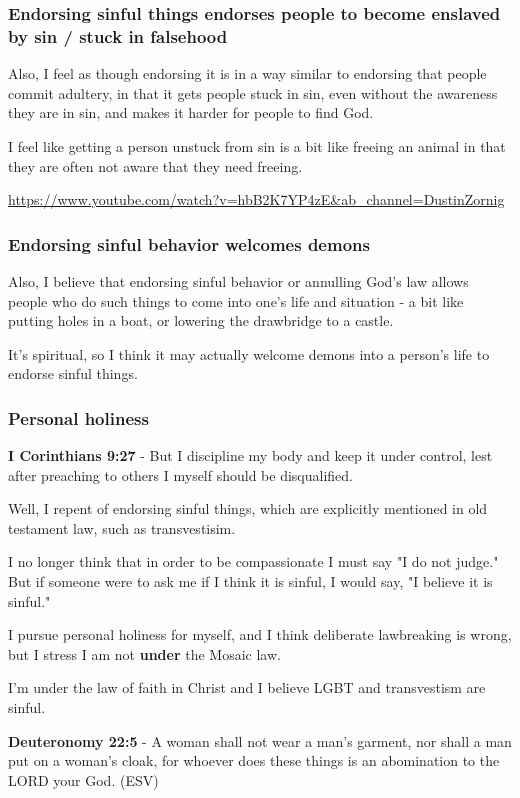 \documentclass[11pt]{article}
\begin{document}
\subsubsection{Endorsing sinful things endorses people to become enslaved by sin / stuck in falsehood}
\label{sec:org3cfaa02}
Also, I feel as though endorsing it is in a
way similar to endorsing that people commit
adultery, in that it gets people stuck in sin,
even without the awareness they are in sin,
and makes it harder for people to find God.

I feel like getting a person unstuck from sin
is a bit like freeing an animal in that they
are often not aware that they need freeing.

\url{https://www.youtube.com/watch?v=hbB2K7YP4zE\&ab\_channel=DustinZornig}

\subsubsection{Endorsing sinful behavior welcomes demons}
\label{sec:org3af550f}
Also, I believe that endorsing sinful behavior
or annulling God's law allows people who do
such things to come into one's life and
situation - a bit like putting holes in a
boat, or lowering the drawbridge to a castle.

It's spiritual, so I think it may actually
welcome demons into a person's life to endorse
sinful things.

\subsubsection{Personal holiness}
\label{sec:org0f1dd6d}
\textbf{I Corinthians 9:27} - But I discipline my body and keep it under control, lest after preaching to others I myself should be disqualified.

Well, I repent of endorsing sinful things,
which are explicitly mentioned in old
testament law, such as transvestisim.

I no longer think that in order to be compassionate I must say "I do not judge."
But if someone were to ask me if I think it is sinful, I would say, "I believe it is sinful."

I pursue personal holiness for myself, and I
think deliberate lawbreaking is wrong,
but I stress I am not \textbf{under} the Mosaic law.

I'm under the law of faith in Christ and I believe
LGBT and transvestism are sinful.

\textbf{Deuteronomy 22:5} - A woman shall not wear a man's garment, nor shall a man put on a woman's cloak, for whoever does these things is an abomination to the LORD your God. (ESV)
\end{document}
